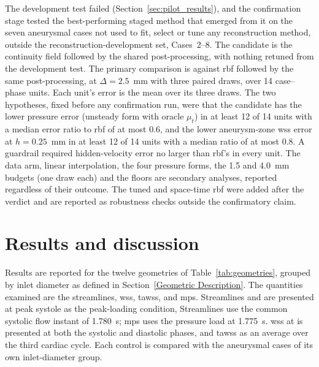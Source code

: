 \documentclass[12pt,a4paper]{article}
\newcommand{\cfdrevision}[1]{#1} %
\newcommand{\WSS}{\ac{wss}\xspace}
\newcommand{\TAWSS}{\ac{tawss}\xspace}
\newcommand{\MPS}{\ac{mps}\xspace}
\newcommand{\RBF}{\ac{rbf}\xspace}
\theoremstyle{definition}
\numberwithin{equation}{section}
\providecommand{\DIFaddtex}[1]{{\protect\color{blue} \sf #1}} %
\providecommand{\DIFdeltex}[1]{{\protect\color{red} \scriptsize #1}} %
\providecommand{\DIFaddbegin}{} %
\providecommand{\DIFaddend}{} %
\providecommand{\DIFdelbegin}{} %
\providecommand{\DIFdelend}{} %
\providecommand{\DIFadd}[1]{\texorpdfstring{\DIFaddtex{#1}}{#1}} %
\providecommand{\DIFdel}[1]{\texorpdfstring{\DIFdeltex{#1}}{}} %
\newcommand{\DIFscaledelfig}{0.5}
\newlength{\DIFdelgraphicswidth} %
\newlength{\DIFdelgraphicsheight} %
\newcommand{\DIFaddincludegraphics}[2][]{{\color{blue}\fbox{\DIFOincludegraphics[#1]{#2}}}} %
\newcommand{\DIFdelincludegraphics}[2][]{%
\sbox{\DIFdelgraphicsbox}{\DIFOincludegraphics[#1]{#2}}%
\settoboxwidth{\DIFdelgraphicswidth}{\DIFdelgraphicsbox} %
\settoboxtotalheight{\DIFdelgraphicsheight}{\DIFdelgraphicsbox} %
\scalebox{\DIFscaledelfig}{%
\parbox[b]{\DIFdelgraphicswidth}{\usebox{\DIFdelgraphicsbox}\\[-\baselineskip] \rule{\DIFdelgraphicswidth}{0em}}\llap{\resizebox{\DIFdelgraphicswidth}{\DIFdelgraphicsheight}{%
\setlength{\unitlength}{\DIFdelgraphicswidth}%
\begin{picture}(1,1)%
\thicklines\linethickness{2pt} %
{\color[rgb]{1,0,0}\put(0,0){\framebox(1,1){}}}%
{\color[rgb]{1,0,0}\put(0,0){\line( 1,1){1}}}%
{\color[rgb]{1,0,0}\put(0,1){\line(1,-1){1}}}%
\end{picture}%
}\hspace*{3pt}}} %
} %
\DeclareRobustCommand{\DIFaddbegin}{\DIFOaddbegin \let\includegraphics\DIFaddincludegraphics} %
\DeclareRobustCommand{\DIFaddend}{\DIFOaddend \let\includegraphics\DIFOincludegraphics} %
\DeclareRobustCommand{\DIFdelbegin}{\DIFOdelbegin \let\includegraphics\DIFdelincludegraphics} %
\DeclareRobustCommand{\DIFdelend}{\DIFOaddend \let\includegraphics\DIFOincludegraphics} %
\begin{document}
The development test failed (Section~\ref{sec:pilot_results}), and the confirmation stage tested the best-performing staged method that emerged from it on the seven aneurysmal cases \DIFdelbegin \DIFdel{not used to fit, select or tune any reconstruction method, }\DIFdelend \DIFaddbegin \DIFadd{outside the reconstruction-development set, }\DIFaddend Cases~2--8. The candidate is the continuity field followed by the shared post-processing, with nothing retuned from the development test. The primary comparison is against \RBF followed by the same post-processing, at $\Delta=2.5$~mm with three paired draws, over 14 case--phase units. Each unit's error is the mean over its three draws. The two hypotheses, fixed before any confirmation run, were that the candidate has the lower pressure error (unsteady form with oracle $\mu_t$) in at least 12 of 14 units with a median error ratio to \RBF of at most 0.6, and the lower aneurysm-zone \WSS error at $h=0.25$~mm in at least 12 of 14 units with a median ratio of at most 0.8. A guardrail required hidden-velocity error no larger than \RBF's in every unit. The data arm, linear interpolation, the four pressure forms, the 1.5 and 4.0~mm budgets (one draw each) and the floors are secondary analyses, reported regardless of their outcome. The tuned and space-time \RBF were added after the verdict and are reported as robustness checks outside the confirmatory claim.

\section{\label{Results and Discussions}Results and discussion}
\label{sec:cfd_results}
Results are reported for the twelve geometries of Table~\ref{tab:geometries},
grouped by inlet diameter as defined in Section~\ref{Geometric Description}. The
quantities examined are the streamlines, \WSS, \TAWSS, and \MPS. \DIFdelbegin \DIFdel{Streamlines and
}%
\DIFdel{are presented at peak systole as the peak-loading condition, }\DIFdelend \DIFaddbegin \DIFadd{\cfdrevision{Streamlines use the common systolic flow instant of 1.780~s; \MPS uses the pressure load at 1.775~s.} }\DIFaddend \WSS \DIFdelbegin \DIFdel{at }\DIFdelend \DIFaddbegin \DIFadd{is presented at }\DIFaddend both
the systolic and diastolic phases, and \TAWSS as an average over the third
cardiac cycle. Each control is compared with the aneurysmal cases of its own
inlet-diameter group.
\end{document}
